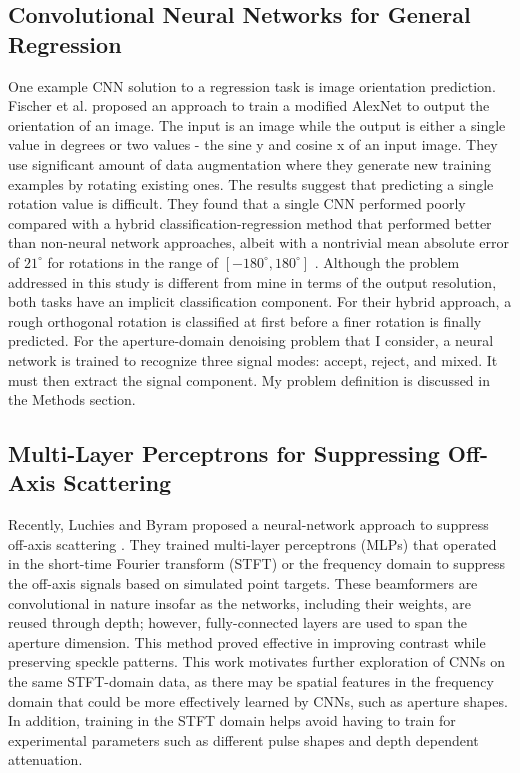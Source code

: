     \subsection{Convolutional Neural Networks for General Regression}
      One example CNN solution to a regression task is image orientation prediction. Fischer et al. proposed an approach to train a modified AlexNet to output the orientation of an image. The input is an image while the output is either a single value in degrees or two values - the sine y and cosine x of an input image. They use significant amount of data augmentation where they generate new training examples by rotating existing ones. The results suggest that predicting a single rotation value is difficult. They found that a single CNN performed poorly compared with a hybrid classification-regression method that performed better than non-neural network approaches, albeit with a nontrivial mean absolute error of $21^{\circ}$ for rotations in the range of $[-180^{\circ}, 180^{\circ}]$ \cite{fischer2015image}. Although the problem addressed in this study is different from mine in terms of the output resolution, both tasks have an implicit classification component. For their hybrid approach, a rough orthogonal rotation is classified at first before a finer rotation is finally predicted. For the aperture-domain denoising problem that I consider, a neural network is trained to recognize three signal modes: accept, reject, and mixed. It must then extract the signal component. My problem definition is discussed in the Methods section.

    \subsection{Multi-Layer Perceptrons for Suppressing Off-Axis Scattering}
      Recently, Luchies and Byram proposed a neural-network approach to suppress off-axis scattering \cite{luchies_tmi_2018, training_improvements}. They trained multi-layer perceptrons (MLPs) that operated in the short-time Fourier transform (STFT) or the frequency domain to suppress the off-axis signals based on simulated point targets. These beamformers are convolutional in nature insofar as the networks, including their weights, are reused through depth; however, fully-connected layers are used to span the aperture dimension. This method proved effective in improving contrast while preserving speckle patterns. This work motivates further exploration of CNNs on the same STFT-domain data, as there may be spatial features in the frequency domain that could be more effectively learned by CNNs, such as aperture shapes. In addition, training in the STFT domain helps avoid having to train for experimental parameters such as different pulse shapes and depth dependent attenuation. %

